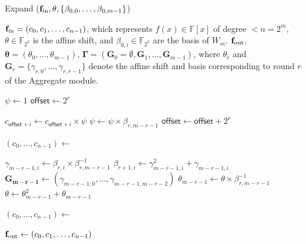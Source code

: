\begin{algorithm}
	\caption{\textsf{Expand} (${\bf{f}}_\text{in}, \theta, \{\beta_{0,0}, \ldots, \beta_{0, m-1}\}$)}
	\label{Algo:Expand}
	\begin{algorithmic}[1]
		\Require ${\bf{f}}_\text{in} = (c_0,c_1,\ldots,c_{n-1})$, which represents $f(x) \in \mathbb{F}[x]$ of degree $< n = 2^m$, 
		$\theta \in \mathbb{F}_{2^k}$ is the affine shift, 
		and $\beta_{0,i} \in \mathbb{F}_{2^k}$ are the basis of $W_m$.
		\Ensure ${\bf{f}}_\text{out}$, $\boldsymbol{\theta} = (\theta_0, \ldots, \theta_{m-1})$, 
		$\boldsymbol{\Gamma} = (\mathbf{G}_0 = \emptyset, \mathbf{G}_1, \ldots, \mathbf{G}_{m-1})$, 
		where $\theta_r$ and $\mathbf{G}_r = \{\gamma_{r,0},\ldots, \gamma_{r,r-1}\}$ denote the affine shift and basis corresponding to round $r$ of the \textsf{Aggregate} module.
		
		\State $\psi \gets 1$  \label{line:expand-psi-init}
		\State $\mathsf{offset} \gets 2^r$
		
		\State $c_{\mathsf{offset}+i} \gets c_{\mathsf{offset}+i} \times \psi$ \label{line:expand-scale}
		\EndFor
		\State $\psi \gets \psi \times \beta_{r,m-r-1}$ \label{line:expand-psi}
		\State $\mathsf{offset} \gets \mathsf{offset} + 2^r$
		\EndWhile
		
		\State $(c_0,\ldots,c_{n-1}) \gets$   \label{line:expand-taylor}
		
		\State $\gamma_{m-r-1,i} \gets \beta_{r,i} \times \beta_{r,m-r-1}^{-1}$ \label{line:expand-gamma_computaion}   
		\State $\beta_{r+1,i} \gets \gamma_{m-r-1,i}^2 + \gamma_{m-r-1,i}$ \label{line:expand-beta_computaion}
		\EndFor
		\State $\mathbf{G_{m-r-1}} \gets (\gamma_{m-r-1,0}, \ldots, \gamma_{m-r-1,m-r-2})$
		\State $\theta_{m-r-1} \gets \theta \times \beta_{r,m-r-1}^{-1}$ \label{line:expand-theta1_computaion}
		\State $\theta \gets \theta_{m-r-1}^2 + \theta_{m-r-1}$ \label{line:expand-theta2_computaion}
		\EndFor
		
		\State $(c_0,\ldots,c_{n-1}) \gets$ 
		
		\State \Return ${\bf{f}}_\text{out} \gets (c_0,c_1,\ldots,c_{n-1})$
	\end{algorithmic}
\end{algorithm}






